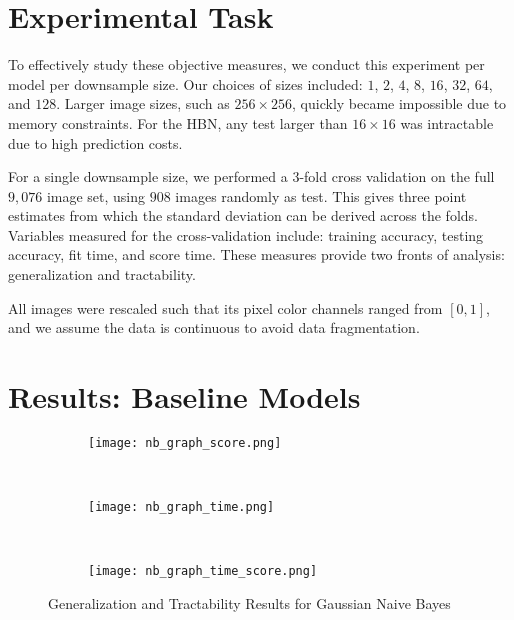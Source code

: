 \documentclass{article}
\begin{document}



\section{Experimental Task}
\label{sec:task}
To effectively study these objective measures, we conduct this experiment
per model per downsample size. Our choices of sizes
included: $1$, $2$, $4$, $8$, $16$, $32$, $64$, and $128$. Larger image sizes,
such as $256 \times 256$, quickly became impossible due to memory constraints.
For the HBN, any test larger than $16 \times 16$ was intractable
due to high prediction costs.

For a single downsample size, we performed a $3$-fold cross validation on
the full $9,076$ image set, using $908$
images randomly as test. This gives three point estimates from which
the standard deviation can be derived across the folds. Variables measured for the
cross-validation include: training accuracy, testing accuracy, fit time, and
score time. These measures provide two fronts of analysis: generalization and
tractability.

All images were rescaled such that its pixel color channels ranged from
$[0, 1]$, and we assume the data is continuous to avoid data
fragmentation.


\section{Results: Baseline Models}

\label{sec:results-baseline}

\begin{figure}
  \centering
  \begin{subfigure}[b]{0.3\textwidth}
    \centering
    \texttt{[image: nb\_graph\_score.png]}
    \caption*{}
    \label{fig:nb_graph_score}
  \end{subfigure}
  ~
  \begin{subfigure}[b]{0.3\textwidth}
    \centering
    \texttt{[image: nb\_graph\_time.png]}
    \caption*{}
    \label{fig:nb_graph_time}
  \end{subfigure}
  ~
  \begin{subfigure}[b]{0.3\textwidth}
    \centering
    \texttt{[image: nb\_graph\_time\_score.png]}
    \caption*{}
    \label{fig:nb_graph_time_score}
  \end{subfigure}
  \vspace{-20pt}
  \caption{Generalization and Tractability Results for Gaussian Naive Bayes}
  \label{fig:GNB}
\end{figure}
\end{document}
